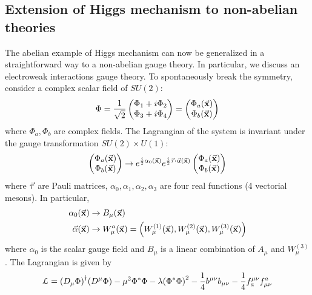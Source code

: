 \documentclass[../../Main/Main.tex]{subfiles}
\begin{document}
\subsection{Extension of Higgs mechanism to non-abelian theories}
The abelian example of Higgs mechanism can now be generalized in a straightforward way to a non-abelian gauge theory. In particular, we discuss an electroweak interactions gauge theory.
To spontaneously break the symmetry, consider a complex scalar field of \( SU(2) \):
\begin{equation}
  \Phi = \frac{1}{\sqrt{2} } \begin{pmatrix}
  \Phi _1 + i \Phi _2 \\
  \Phi _3 + i \Phi _4
  \end{pmatrix}
  =
  \begin{pmatrix}
  \Phi _a (\va{x}) \\
  \Phi _b (\va{x})
  \end{pmatrix}
\end{equation}
where \( \Phi _a, \Phi _b \) are complex fields. The Lagrangian of the system is invariant under the gauge transformation \( SU(2) \times U(1) \):
\begin{equation*}
  \begin{pmatrix}
  \Phi _a (\va{x}) \\
  \Phi _b (\va{x})
  \end{pmatrix}
  \rightarrow
  e^{\frac{i}{2} \alpha _0 (\va{x})} e^{\frac{i}{2} \va{\tau } \vdot \va{\alpha } (\va{x})}
  \begin{pmatrix}
  \Phi _a (\va{x}) \\
  \Phi _b (\va{x})
  \end{pmatrix}
\end{equation*}
where \( \va{\tau } \) are Pauli matrices, \( \alpha _0, \alpha _1, \alpha _2, \alpha_3 \) are four real functions (4 vectorial mesons). In particular,
\begin{subequations}
\begin{align*}
  \alpha _0 (\va{x}) & \rightarrow B _ \mu (\va{x}) \\
   \va{\alpha } (\va{x}) & \rightarrow W _ \mu ^ a (\va{x}) = \qty( W_ \mu ^{(1)} (\va{x}),  W_ \mu ^{(2)} (\va{x}),  W_ \mu ^{(3)} (\va{x}) )
\end{align*}
\end{subequations}
where \( \alpha _0 \) is the scalar gauge field and \( B _ \mu  \) is a linear combination of \( A_ \mu  \) and \(  W_ \mu ^{(3)}  \).
The  Lagrangian is given by
\begin{equation}
  \mathcal{L} = \qty(D_ \mu \Phi )^\dagger \qty(D ^ \mu \Phi ) - \mu ^2 \Phi ^* \Phi - \lambda \qty(\Phi ^* \Phi )^2
  - \frac{1}{4} b^{\mu \nu } b_{\mu \nu } - \frac{1}{4} f_a^{\mu \nu } f_{\mu \nu }^a
\end{equation}
\end{document}
